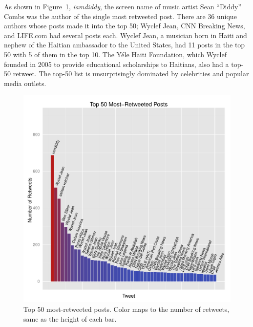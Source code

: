 \documentclass[a4paper, 11pt, titlepage]{article}
\begin{document}
As shown in Figure~\ref{fig:rt_top_50}, \textit{iamdiddy}, the screen name of music artist Sean ``Diddy'' Combs was the author of the single most retweeted post.  There are 36 unique authors whose posts made it into the top 50; Wyclef Jean, CNN Breaking News, and LIFE.com had several posts each.  Wyclef Jean, a musician born in Haiti and nephew of the Haitian ambassador to the United States, had 11 posts in the top 50 with 5 of them in the top 10.  The Y\'{e}le Haiti Foundation, which Wyclef founded in 2005 to provide educational scholarships to Haitians, also had a top-50 retweet.  The top-50 list is unsurprisingly dominated by celebrities and popular media outlets.

\begin{figure}[h]
\centering
\includegraphics[width=120mm]{../figures/rt_top_50}
\caption{Top 50 most-retweeted posts. Color maps to the number of retweets, same as the height of each bar.}
\label{fig:rt_top_50}
\end{figure}
\end{document}
